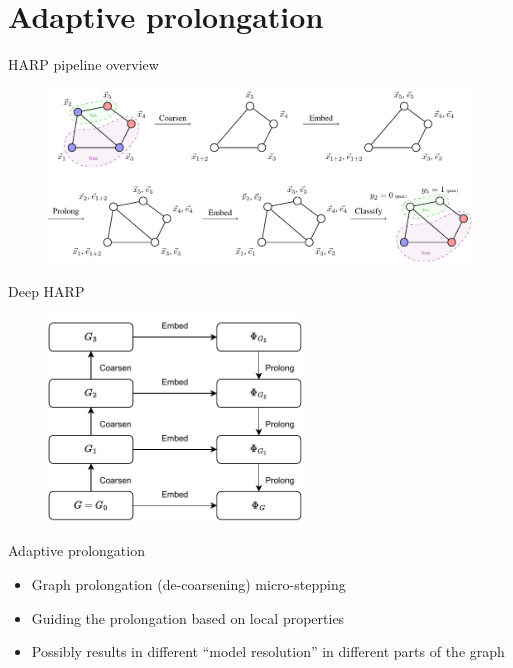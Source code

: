 \documentclass[10pt]{beamer}
\begin{document}
\section{Adaptive prolongation}

\begin{frame}{HARP pipeline overview}
	\begin{figure}
		\centering
		\includegraphics[width=\textwidth]{images/harp-overview/harp-overview.pdf}
	\end{figure}
\end{frame}

\begin{frame}{Deep HARP}
	\begin{figure}
		\centering
		\includegraphics[width=0.6\textwidth]{images/deep-harp/deep-harp.pdf}
	\end{figure}
\end{frame}

\begin{frame}{Adaptive prolongation}
	\begin{itemize}
		\item Graph prolongation (de-coarsening) micro-stepping
		\item Guiding the prolongation based on local properties
		\item Possibly results in different \enquote{model resolution} in different parts of the graph
	\end{itemize}
\end{frame}
\end{document}
